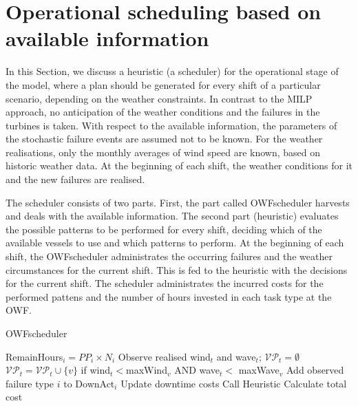 \section{Operational scheduling based on available information}
\label{sec:heuristic}
In this Section, we discuss a heuristic (a scheduler) for the operational stage of the model, where a plan should be generated for every shift of a particular scenario, depending on the weather constraints. In contrast to the MILP approach, no  anticipation of the weather conditions and the failures in the turbines is taken. With respect to the available information, the parameters of the stochastic failure events are assumed not to be known. For the weather realisations, only the monthly averages of wind speed are known, based on historic weather data. At the beginning of each shift, the weather conditions for it and the new failures are realised.

The scheduler consists of two parts. First, the part called OWFscheduler harvests and deals with the available information. The second part (heuristic) evaluates the possible patterns to be performed for every shift, deciding which of the available vessels to use and which patterns to perform.
%
At the beginning of each shift, the OWFscheduler administrates the occurring failures and the weather circumstances for the current shift. This is fed to the heuristic with the decisions for the current shift. The scheduler administrates the incurred costs for the performed pattens and the number of hours invested in each task type at the OWF. 
\begin{algorithm}[h]
	\caption{OWFscheduler}
	\label{alg:scheduler}
	\begin{algorithmic}
		\medskip
			\STATE RemainHours$_i=PP_i\times N_i$
		\ENDFOR
			\STATE Observe realised  wind$_t$ and wave$_t$; $\mathcal{VP}_t=\emptyset$
				\STATE $\mathcal{VP}_t=\mathcal{VP}_t \cup \{v\}$ if wind$_t<$maxWind$_v$ AND wave$_t<$ maxWave$_v$
				\STATE Add observed failure type $i$ to DownAct$_i$
				\STATE Update downtime costs
			\ENDFOR
			\STATE Call Heuristic
			\ENDFOR
		\STATE Calculate total cost
		\vskip 5pt
	\end{algorithmic}
\end{algorithm}
